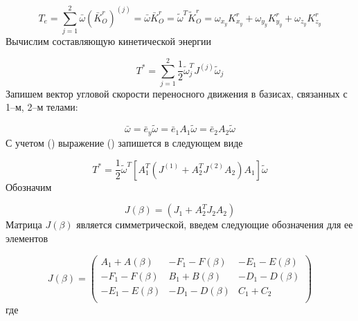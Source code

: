 \begin{equation} %
\label{eq:p3:17}
T_{e}= 
\sum_{j=1}^{2} \bar{\omega} \left( \bar{K}_{O}^{r} \right)^{ \left( j \right) }= 
\bar{\omega} \bar{K}_{O}^{r}= 
\tilde{\omega}^{T}\tilde{K}_{O}^{r}= 
\omega_{x_{y}}K_{x_{y}}^{r}+ \omega_{y_{y}}K_{y_{y}}^{r}+ \omega_{z_{y}}K_{z_{y}}^{r}
\end{equation}
Вычислим составляющую кинетической энергии \par


\begin{equation} %
\label{eq:p3:18}
T^{\ast}= \sum_{j=1}^{2}\frac{1}{2} \tilde{\omega}_{j}^{T}J^{ \left( j \right) } \tilde{\omega}_{j}
\end{equation}
Запишем вектор угловой скорости переносного движения в базисах, связанных с 1–м, 2–м телами:\par


\begin{equation} %
\label{eq:p3:19}
\bar{\omega} =\bar{e}_{y} \tilde{\omega} =\bar{e}_{1}A_{1} \tilde{\omega} =\bar{e}_{2}A_{2} \tilde{\omega} 
\end{equation}
С учетом () выражение () запишется в следующем виде\par


\begin{equation} %
\label{eq:p3:20}
T^{\ast}=
\frac{1}{2} \tilde{\omega} ^{T} [ A_{1}^{T} ( J^{ ( 1 ) }+A_{2}^{T}J^{ ( 2 ) }A_{2} ) A_{1} ]  \tilde{\omega}
\end{equation}
Обозначим\par


\begin{equation} %
\label{eq:p3:21}
J \left(  \beta  \right) = \left( J_{1}+A_{2}^{T}J_{2}A_{2} \right) 
\end{equation}
Матрица  \( J \left(  \beta  \right)  \)  является симметрической, введем следующие обозначения для ее элементов\par


\begin{equation} %
\label{eq:p3:22}
J \left(  \beta  \right) = \left( \begin{matrix}
A_{1}+A \left(  \beta  \right)   &  -F_{1}-F \left(  \beta  \right)   &  -E_{1}-E \left(  \beta  \right) \\
-F_{1}-F \left(  \beta  \right)   &  B_{1}+B \left(  \beta  \right)   &  -D_{1}-D \left(  \beta  \right) \\
-E_{1}-E \left(  \beta  \right)   &  -D_{1}-D \left(  \beta  \right)   &  C_{1}+C_{2}\\
\end{matrix}
\right) 
\end{equation}
где\par

